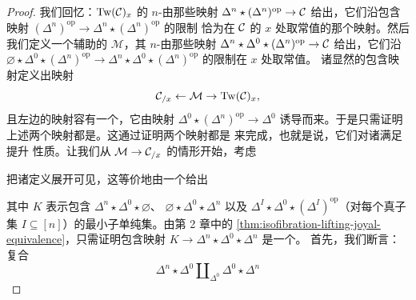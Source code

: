 \begin{proof}
我们回忆：$\mathrm{Tw}(\mathcal{C})_x$ 的 $n$-\trSimplex{}由那些映射
$\Delta^n \star (\Delta^n)^{\mathrm{op}} \to \mathcal{C}$ 给出，它们沿包含映射
$(\Delta^n)^{\mathrm{op}} \to \Delta^n \star (\Delta^n)^{\mathrm{op}}$ 的限制
恰为在 $\mathcal{C}$ 的\trObject{} $x$ 处取常值的那个映射。然后我们定义一个辅助的%
\trSimplicialSet{} $\mathcal{M}$，其 $n$-\trSimplex{}由那些映射
$\Delta^n \star \Delta^0 \star (\Delta^n)^{\mathrm{op}} \to \mathcal{C}$ 给出，它们沿
$\varnothing \star \Delta^0 \star (\Delta^n)^{\mathrm{op}} \to \Delta^n \star \Delta^0 \star (\Delta^n)^{\mathrm{op}}$
的限制在 $x$ 处取常值。
诸显然的包含映射定义出映射
\[
\mathcal{C}_{/x} \leftarrow \mathcal{M} \to \mathrm{Tw}(\mathcal{C})_x,
\]
且左边的映射容有一个\trSectionMap{}，它由映射
$\Delta^0 \star (\Delta^n)^{\mathrm{op}} \to \Delta^0$ 诱导而来。于是只需证明
上述两个映射都是\trJoyalEquivalence{}。这通过证明两个映射都是%
\trTrivialFibration{}来完成，也就是说，它们对诸\trBoundaryInclusion{}满足提升
性质。让我们从 $\mathcal{M} \to \mathcal{C}_{/x}$ 的情形开始，考虑\trLiftingProblem{}%
\begin{center}
\end{center}
把诸定义展开可见，这等价地由一个\trLiftingProblem{}给出
\begin{center}
\end{center}
其中 $K$ 表示包含
$\Delta^n \star \Delta^0 \star \varnothing$、
$\varnothing \star \Delta^0 \star \Delta^n$ 以及
$\Delta^I \star \Delta^0 \star (\Delta^I)^{\mathrm{op}}$（对每个真子集
$I \subseteq [n]$）的最小子单纯集。由第 2 章中的%
\cref{thm:isofibration-lifting-joyal-equivalence}，只需证明包含映射
$K \to \Delta^n \star \Delta^0 \star \Delta^n$ 是一个\trJoyalEquivalence{}。
首先，我们断言：复合
\[
\Delta^n \star \Delta^0 \amalg_{\Delta^0} \Delta^0 \star \Delta^n
\]
\end{proof}
